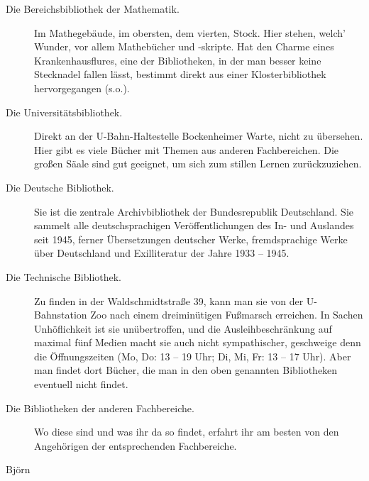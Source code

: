 \begin{description}
\item[Die Bereichsbibliothek der Mathematik.] Im Mathegebäude, im obersten, dem vierten, Stock. Hier stehen, welch’ Wunder, vor allem Mathebücher und -skripte. Hat den Charme eines Krankenhausflures, eine der Bibliotheken, in der man besser keine Stecknadel fallen lässt, bestimmt direkt aus einer Klosterbibliothek hervorgegangen (s.o.).

\item[Die Universitätsbibliothek.] Direkt an der U-Bahn-Haltestelle Bockenheimer Warte, nicht zu übersehen. Hier gibt es viele Bücher mit Themen aus anderen Fachbereichen. Die großen Säale sind gut geeignet, um sich zum stillen Lernen zurückzuziehen.

\item[Die Deutsche Bibliothek.] Sie ist die zentrale Archivbibliothek der Bundesrepublik Deutschland. Sie sammelt alle deutschsprachigen Veröffentlichungen des In- und Auslandes seit 1945, ferner Übersetzungen deutscher Werke, fremdsprachige Werke über Deutschland und Exilliteratur der Jahre 1933 -- 1945.

\item[Die Technische Bibliothek.] Zu finden in der Waldschmidtstraße 39, kann man sie von der U-Bahnstation Zoo nach einem dreiminütigen Fußmarsch erreichen. In Sachen Unhöflichkeit ist sie unübertroffen, und die Ausleihbeschränkung auf maximal fünf Medien macht sie auch nicht sympathischer, geschweige denn die Öffnungszeiten (Mo, Do: 13 -- 19 Uhr; Di, Mi, Fr: 13 -- 17 Uhr). Aber man findet dort Bücher, die man in den oben genannten Bibliotheken eventuell nicht findet.

\item[Die Bibliotheken der anderen Fachbereiche.] Wo diese sind und was ihr da so findet, erfahrt ihr am besten von den Angehörigen der entsprechenden Fachbereiche.
\end{description}

\begin{flushright} Björn\end{flushright}